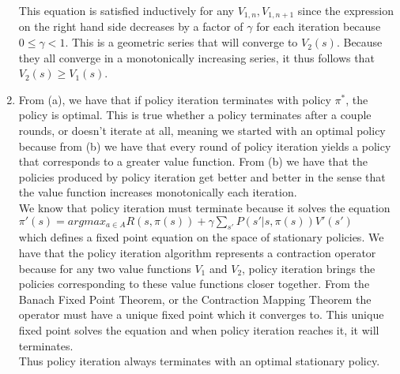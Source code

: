 \documentclass[12pt,letterpaper]{article}
\begin{document}
\begin{enumerate}[label={(\alph*) }]
This equation is satisfied inductively for any $V_{1,n}, V_{1,n+1}$ since the expression on the right hand side decreases by a factor of $\gamma$ for each iteration because $0 \leq \gamma < 1$. This is a geometric series that will converge to $V_2(s)$. Because they all converge in a monotonically increasing series, it thus follows that $V_2(s) \geq V_1(s)$. \\
\item From (a), we have that if policy iteration terminates with policy $\pi^*$, the policy is optimal. This is true whether a policy terminates after a couple rounds, or doesn't iterate at all, meaning we started with an optimal policy because from (b) we have that every round of policy iteration yields a policy that corresponds to a greater value function. From (b) we have that the policies produced by policy iteration get better and better in the sense that the value function increases monotonically each iteration. \\

We know that policy iteration must terminate because it solves the equation \\ $\displaystyle{\pi '(s) = argmax_{a \in A} R(s, \pi(s)) + \gamma \sum_{s'}{P(s' | s, \pi(s))V'(s')}}$ \\
which defines a fixed point equation on the space of stationary policies. We have that the policy iteration algorithm represents a contraction operator because for any two value functions $V_1$ and $V_2$, policy iteration brings the policies corresponding to these value functions closer together. From the Banach Fixed Point Theorem, or the Contraction Mapping Theorem the operator must have a unique fixed point which it converges to. This unique fixed point solves the equation and when policy iteration reaches it, it will terminates. \\

Thus policy iteration always terminates with an optimal stationary policy.
\end{enumerate}
\end{document}
